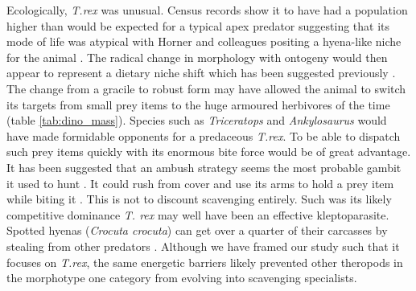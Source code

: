 \indent
Ecologically, \textit{T.rex} was unusual. Census records show it to have had a population higher than would be expected for a typical apex predator suggesting that its mode of life was atypical with Horner and colleagues positing a hyena-like niche for the animal \citep{horner2011dinosaur,mills1984comparative}. The radical change in morphology with ontogeny would then appear to represent a dietary niche shift which has been suggested previously \citep{brusatte2010tyrannosaur}. The change from a gracile to robust form may have allowed the animal to switch its targets from small prey items to the huge armoured herbivores of the time (table \ref{tab:dino_mass}). Species such as \textit{Triceratops} and \textit{Ankylosaurus} would have made formidable opponents for a predaceous \textit{T.rex}. To be able to dispatch such prey items quickly with its enormous bite force would be of great advantage. It has been suggested that an ambush strategy seems the most probable gambit it used to hunt \citep{krauss2013biomechanics}. It could rush from cover and use its arms to hold a prey item while biting it \citep{krauss2013biomechanics}. This is not to discount scavenging entirely. Such was its likely competitive dominance \textit{T. rex} may well have been an effective kleptoparasite. Spotted hyenas (\textit{Crocuta crocuta}) can get over a quarter of their carcasses by stealing from other predators \citep{curio1976ethology}. 
Although we have framed our study such that it focuses on \textit{T.rex}, the same energetic barriers likely prevented other theropods in the morphotype one category \citep{weishampel2004dinosauria} from evolving into scavenging specialists. 


